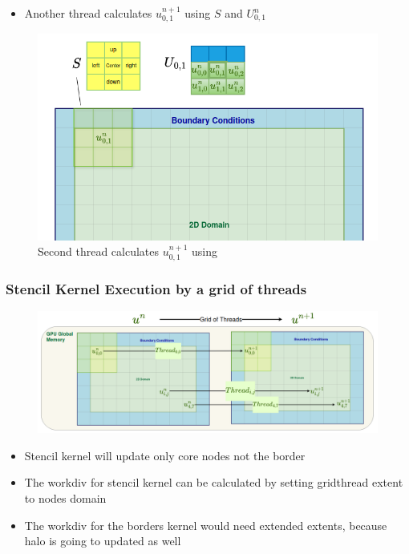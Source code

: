 \documentclass[9pt]{beamer}
\begin{document}
\begin{frame}
\vspace{-0.9\baselineskip}
    \begin{itemize}
        \item Another thread calculates $u_{0,1}^{n+1}$  using $S$ and $U^{n}_{0,1}$
    \end{itemize}
    \begin{figure}
        \centering
        \includegraphics[width=0.8\linewidth]{Screenshot from 2024-09-21 23-44-50.png}
        \caption{Second thread calculates $u_{0,1}^{n+1}$ using }
        \label{fig:enter-label}
    \end{figure}
\end{frame}

\begin{frame}
\frametitle{Stencil Kernel Execution by a grid of threads}
\begin{figure}
    \centering
    \includegraphics[width=0.86\linewidth]{Screenshot from 2024-10-02 16-04-45.png}
\end{figure}

\begin{itemize}
    \item Stencil kernel will update only core nodes not the border
    \item The workdiv for stencil kernel can be calculated by setting gridthread extent to nodes domain
    \item The workdiv for the borders kernel would need extended extents, because halo is going to updated as well
\end{itemize}


\end{frame}
\end{document}
